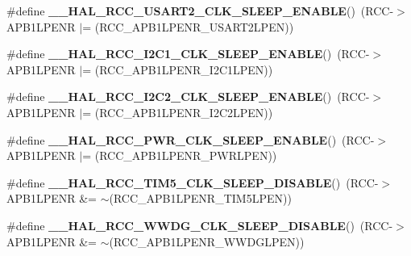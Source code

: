 \begin{DoxyCompactItemize}
\#define {\bfseries \+\_\+\+\_\+\+H\+A\+L\+\_\+\+R\+C\+C\+\_\+\+U\+S\+A\+R\+T2\+\_\+\+C\+L\+K\+\_\+\+S\+L\+E\+E\+P\+\_\+\+E\+N\+A\+B\+LE}()~(R\+CC-\/$>$A\+P\+B1\+L\+P\+E\+NR $\vert$= (R\+C\+C\+\_\+\+A\+P\+B1\+L\+P\+E\+N\+R\+\_\+\+U\+S\+A\+R\+T2\+L\+P\+EN))
\item 
\mbox{\label{group___r_c_c___a_p_b1___low_power___enable___disable_ga894dbeada170b01faef303d35de84917}} 
\#define {\bfseries \+\_\+\+\_\+\+H\+A\+L\+\_\+\+R\+C\+C\+\_\+\+I2\+C1\+\_\+\+C\+L\+K\+\_\+\+S\+L\+E\+E\+P\+\_\+\+E\+N\+A\+B\+LE}()~(R\+CC-\/$>$A\+P\+B1\+L\+P\+E\+NR $\vert$= (R\+C\+C\+\_\+\+A\+P\+B1\+L\+P\+E\+N\+R\+\_\+\+I2\+C1\+L\+P\+EN))
\item 
\mbox{\label{group___r_c_c___a_p_b1___low_power___enable___disable_gac0167c77fa1c00add900bb1cf788e68c}} 
\#define {\bfseries \+\_\+\+\_\+\+H\+A\+L\+\_\+\+R\+C\+C\+\_\+\+I2\+C2\+\_\+\+C\+L\+K\+\_\+\+S\+L\+E\+E\+P\+\_\+\+E\+N\+A\+B\+LE}()~(R\+CC-\/$>$A\+P\+B1\+L\+P\+E\+NR $\vert$= (R\+C\+C\+\_\+\+A\+P\+B1\+L\+P\+E\+N\+R\+\_\+\+I2\+C2\+L\+P\+EN))
\item 
\mbox{\label{group___r_c_c___a_p_b1___low_power___enable___disable_gacad9c9770ee2525fccf6a15e4ee7a07a}} 
\#define {\bfseries \+\_\+\+\_\+\+H\+A\+L\+\_\+\+R\+C\+C\+\_\+\+P\+W\+R\+\_\+\+C\+L\+K\+\_\+\+S\+L\+E\+E\+P\+\_\+\+E\+N\+A\+B\+LE}()~(R\+CC-\/$>$A\+P\+B1\+L\+P\+E\+NR $\vert$= (R\+C\+C\+\_\+\+A\+P\+B1\+L\+P\+E\+N\+R\+\_\+\+P\+W\+R\+L\+P\+EN))
\item 
\mbox{\label{group___r_c_c___a_p_b1___low_power___enable___disable_gaac91e3596950c8d33760debce6b0e416}} 
\#define {\bfseries \+\_\+\+\_\+\+H\+A\+L\+\_\+\+R\+C\+C\+\_\+\+T\+I\+M5\+\_\+\+C\+L\+K\+\_\+\+S\+L\+E\+E\+P\+\_\+\+D\+I\+S\+A\+B\+LE}()~(R\+CC-\/$>$A\+P\+B1\+L\+P\+E\+NR \&= $\sim$(R\+C\+C\+\_\+\+A\+P\+B1\+L\+P\+E\+N\+R\+\_\+\+T\+I\+M5\+L\+P\+EN))
\item 
\mbox{\label{group___r_c_c___a_p_b1___low_power___enable___disable_gae61c24ac6b36e7edbabc5b050b38d63e}} 
\#define {\bfseries \+\_\+\+\_\+\+H\+A\+L\+\_\+\+R\+C\+C\+\_\+\+W\+W\+D\+G\+\_\+\+C\+L\+K\+\_\+\+S\+L\+E\+E\+P\+\_\+\+D\+I\+S\+A\+B\+LE}()~(R\+CC-\/$>$A\+P\+B1\+L\+P\+E\+NR \&= $\sim$(R\+C\+C\+\_\+\+A\+P\+B1\+L\+P\+E\+N\+R\+\_\+\+W\+W\+D\+G\+L\+P\+EN))

\end{DoxyCompactItemize}
